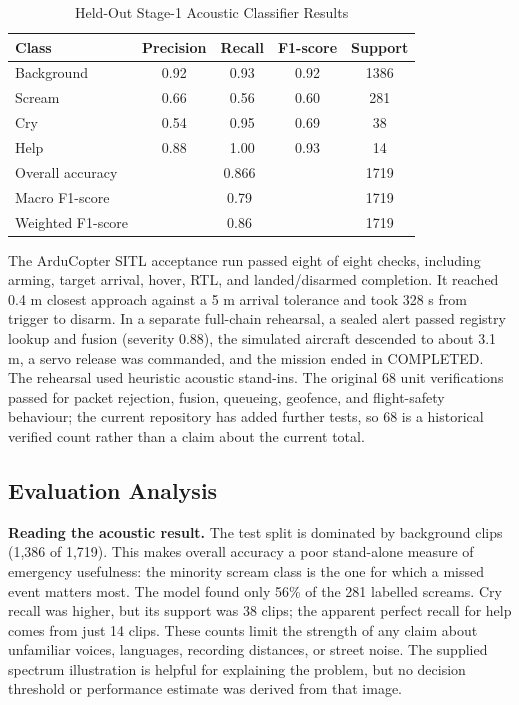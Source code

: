 \documentclass[conference]{IEEEtran}
\begin{document}
\begin{table}[!t]
\caption{Held-Out Stage-1 Acoustic Classifier Results}
\label{tab:classifier}
\centering\footnotesize
\begin{tabular}{|l|c|c|c|c|}
\hline
\textbf{Class} & \textbf{Precision} & \textbf{Recall} & \textbf{F1-score} & \textbf{Support} \\ \hline
Background & 0.92 & 0.93 & 0.92 & 1386 \\ \hline
Scream & 0.66 & 0.56 & 0.60 & 281 \\ \hline
Cry & 0.54 & 0.95 & 0.69 & 38 \\ \hline
Help & 0.88 & 1.00 & 0.93 & 14 \\ \hline
Overall accuracy & \multicolumn{3}{c|}{0.866} & 1719 \\ \hline
Macro F1-score & \multicolumn{3}{c|}{0.79} & 1719 \\ \hline
Weighted F1-score & \multicolumn{3}{c|}{0.86} & 1719 \\ \hline
\end{tabular}
\end{table}

The ArduCopter SITL acceptance run passed eight of eight checks, including arming, target arrival, hover, RTL, and landed/disarmed completion. It reached 0.4 m closest approach against a 5 m arrival tolerance and took 328 s from trigger to disarm. In a separate full-chain rehearsal, a sealed alert passed registry lookup and fusion (severity 0.88), the simulated aircraft descended to about 3.1 m, a servo release was commanded, and the mission ended in COMPLETED. The rehearsal used heuristic acoustic stand-ins. The original 68 unit verifications passed for packet rejection, fusion, queueing, geofence, and flight-safety behaviour; the current repository has added further tests, so 68 is a historical verified count rather than a claim about the current total.


\subsection{Evaluation Analysis}
\textbf{Reading the acoustic result.} The test split is dominated by background clips (1,386 of 1,719). This makes overall accuracy a poor stand-alone measure of emergency usefulness: the minority scream class is the one for which a missed event matters most. The model found only 56\% of the 281 labelled screams. Cry recall was higher, but its support was 38 clips; the apparent perfect recall for help comes from just 14 clips. These counts limit the strength of any claim about unfamiliar voices, languages, recording distances, or street noise. The supplied spectrum illustration is helpful for explaining the problem, but no decision threshold or performance estimate was derived from that image.
\end{document}
